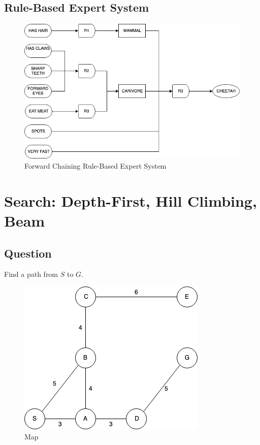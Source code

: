 \documentclass[12pt]{book}
\begin{document}
\subsection{Rule-Based Expert System}
\begin{figure}[ht]
	\centering
	\includegraphics[scale=0.55]{Figure/Figure3_4.png}
	\caption{Forward Chaining Rule-Based Expert System}
\end{figure}
\newpage

\section{Search: Depth-First, Hill Climbing, Beam}
\subsection{Question}
\indent Find a path from $S$ to $G$.
\begin{figure}[ht]
	\centering
	\includegraphics[scale=0.8]{Figure/Figure4_1.png}
	\caption{Map}
\end{figure}
\indent 
\end{document}
